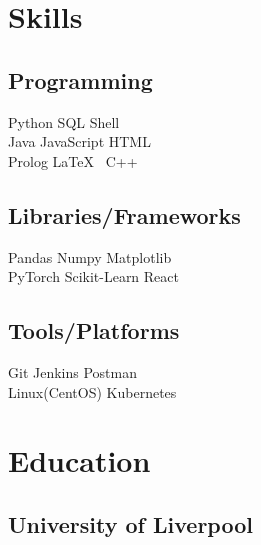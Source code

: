 \documentclass[]{CV}
\begin{document}
\hfill
\begin{minipage}[t]{0.25\textwidth} 


\section{Skills}
\subsection{Programming}
\sectionsep
{}
Python \textbullet{} SQL \textbullet{} Shell \\
\sectionsep
{}
Java \textbullet{} JavaScript \textbullet{}  HTML  \\
\sectionsep
{}
Prolog \textbullet{}  \LaTeX\ \textbullet{} C++  \\
\sectionsep
\sectionsep
\subsection{Libraries/Frameworks}
\sectionsep
Pandas \textbullet{} Numpy \textbullet{} Matplotlib \\ PyTorch \textbullet{} Scikit-Learn \textbullet{} React \\
\sectionsep
\sectionsep
\subsection{Tools/Platforms}
\sectionsep
Git \textbullet{} Jenkins \textbullet{} Postman  \\ Linux(CentOS) \textbullet{} Kubernetes \\

\sectionsep


\section{Education} 
\subsection{University of Liverpool}


\end{minipage}
\end{document}
